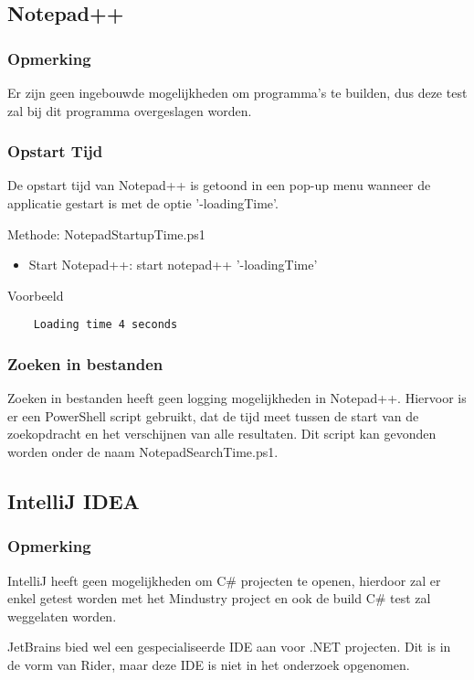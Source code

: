 \subsection{Notepad++}
\subsubsection{Opmerking}
Er zijn geen ingebouwde mogelijkheden om programma’s te builden, dus deze test zal bij dit programma overgeslagen worden.

\subsubsection{Opstart Tijd}
De opstart tijd van Notepad++ is getoond in een pop-up menu wanneer de applicatie gestart is met de optie '-loadingTime'.

Methode: NotepadStartupTime.ps1
\begin{itemize}
	\item Start Notepad++: start notepad++ '-loadingTime'
\end{itemize}

Voorbeeld
\vspace{\verbatimOffset}
\begin{verbatim}
    Loading time 4 seconds    
\end{verbatim}

\subsubsection{Zoeken in bestanden}
Zoeken in bestanden heeft geen logging mogelijkheden in Notepad++. Hiervoor is er een PowerShell script gebruikt, dat de tijd meet tussen de start van de zoekopdracht en het verschijnen van alle resultaten. Dit script kan gevonden worden onder de naam NotepadSearchTime.ps1.

\subsection{IntelliJ IDEA}
\subsubsection{Opmerking}
IntelliJ heeft geen mogelijkheden om C\# projecten te openen, hierdoor zal er enkel getest worden met het Mindustry project en ook de build C\# test zal weggelaten worden.

JetBrains bied wel een gespecialiseerde IDE aan voor .NET projecten. Dit is in de vorm van Rider, maar deze IDE is niet in het onderzoek opgenomen.

